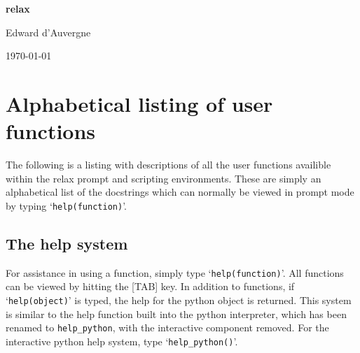 \documentclass[a4paper, 11pt, twoside]{book}
\begin{document}

\begin{titlepage}
\begin{center}


{\huge \textbf{relax}}


{\Large Edward d'Auvergne}


{\large \today}


\end{center}
\end{titlepage}



\tableofcontents




\chapter{Alphabetical listing of user functions}

The following is a listing with descriptions of all the user functions availible within the relax prompt and scripting environments.  These are simply an alphabetical list of the docstrings which can normally be viewed in prompt mode by typing `\texttt{help(function)}'.



\section{The help system}

For assistance in using a function, simply type `\texttt{help(function)}'.  All functions can be viewed by hitting the [TAB] key.  In addition to functions, if `\texttt{help(object)}' is typed, the help for the python object is returned.  This system is similar to the help function built into the python interpreter, which has been renamed to \texttt{help\_python}, with the interactive component removed.  For the interactive python help system, type `\texttt{help\_python()}'.
\end{document}
